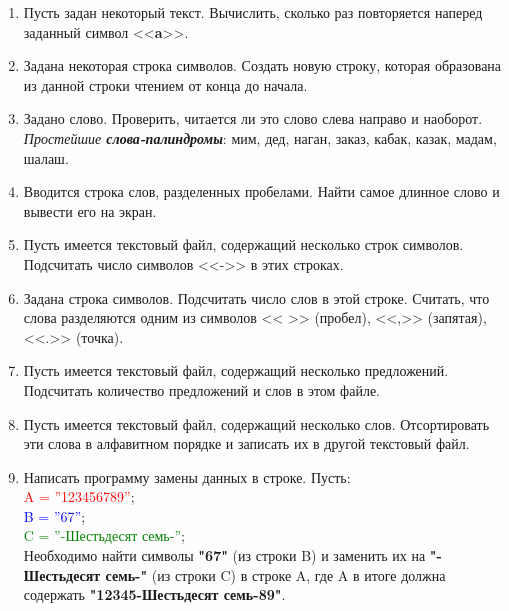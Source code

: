 \begin{enumerate}[leftmargin=*]
\begin{lstlisting}
                         << symbol << "') @\color{Blue}в строке@ \n\n("
                         << str << "')\n\n @\color{Blue}равен@: "<< pos << endl;
            else cout << "@\color{Blue}Такого символа в строке нет@!\n";
            return 0;
        }
    \end{lstlisting}
    \item Пусть задан некоторый текст. Вычислить, сколько раз повторяется наперед заданный символ <<\textbf{a}>>.
    \item Задана некоторая строка символов. Создать новую строку, которая образована из данной строки чтением от конца до начала.
    \item Задано слово. Проверить, читается ли это слово слева направо и наоборот. \textit{Простейшие \textbf{слова-палиндромы}}: мим, дед, наган, заказ, кабак, казак, мадам, шалаш.
    \item Вводится строка слов, разделенных пробелами. Найти самое длинное слово и вывести его на экран. 
    \item Пусть имеется текстовый файл, содержащий несколько строк символов. Подсчитать число символов <<->> в этих строках.
    \item Задана строка символов. Подсчитать число слов в этой строке. Считать, что слова разделяются одним из символов << >> (пробел), <<,>> (запятая), <<.>> (точка).
    \item Пусть имеется текстовый файл, содержащий несколько предложений. Подсчитать количество предложений и слов в этом файле.
    \item Пусть имеется текстовый файл, содержащий несколько слов. Отсортировать эти слова в алфавитном порядке и записать их в другой текстовый файл.
    \item Написать программу замены данных в строке. Пусть:\\ \textcolor{Red}{A = ''123456789''};\\
    \textcolor{Blue}{B = ''67''};\\
    \textcolor{Green}{C = ''-Шестьдесят семь-''};\\
    Необходимо найти символы \textbf{"67"} (из строки B) и заменить их на \textbf{"-Шестьдесят семь-"} (из строки C) в строке A, где A в итоге должна содержать \textbf{"12345-Шестьдесят семь-89"}.
\end{enumerate}
